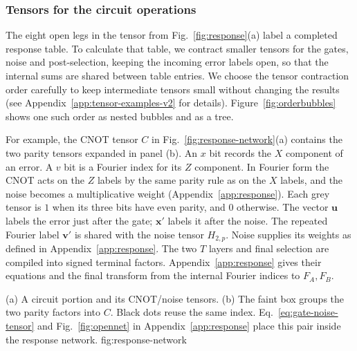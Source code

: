 \subsubsection{Tensors for the circuit operations}
The eight open legs in the tensor from Fig.~\ref{fig:response}(a) label a completed
response table. To calculate that table, we contract smaller tensors
for the gates, noise and post-selection, keeping the incoming error
labels open, so that the internal sums are shared between table entries. 
We choose the tensor contraction order carefully to keep intermediate tensors small
without changing the results (see Appendix~\ref{app:tensor-examples-v2} for details). Figure~\ref{fig:orderbubbles} shows one such order as nested bubbles and as a tree.

For example, the CNOT tensor $C$ in Fig.~\ref{fig:response-network}(a)
contains the two parity tensors expanded in panel (b).
An $x$ bit records the $X$ component
of an error. A $v$ bit is a Fourier index for its $Z$ component.
In Fourier form the CNOT acts on the $Z$ labels by the same parity rule as on the $X$ labels, and the noise becomes a multiplicative weight (Appendix~\ref{app:response}).
Each grey tensor is $1$ when its three bits have even parity, and $0$
otherwise. The vector $\boldsymbol u$ labels the error just after the
gate; $\boldsymbol x'$ labels it after the noise. The repeated Fourier
label $\boldsymbol v'$ is shared with the noise tensor $H_{2,p}$.
Noise supplies its weights as defined in Appendix~\ref{app:response}.
The two $T$ layers and final selection are compiled into signed
terminal factors.
Appendix~\ref{app:response} gives their equations and the final transform
from the internal Fourier indices to $F_A,F_B$.

{(a) A circuit portion and its CNOT/noise tensors.
(b) The faint box groups the two parity factors into $C$.
Black dots reuse the same index. Eq.~\eqref{eq:gate-noise-tensor} and Fig.~\ref{fig:opennet} in Appendix~\ref{app:response} place this pair inside the response network.}
{fig:response-network}



